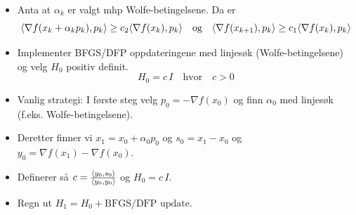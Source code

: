 \begin{itemize}
  \item Anta at \(\alpha_k\) er valgt mhp Wolfe-betingelsene. Da er
  \[
    \langle\nabla f(x_k + \alpha_k p_k), p_k\rangle \geq c_2 \langle\nabla f(x_k), p_k\rangle \quad \text{og} \quad \langle\nabla f(x_{k+1}), p_k\rangle \geq c_1 \langle\nabla f(x_k), p_k\rangle
  \]
  \item Implementer BFGS/DFP oppdateringene med linjesøk (Wolfe-betingelsene) og velg \( H_0 \) positiv definit.
  \[
    H_0 = c \, I \quad \text{hvor} \quad c > 0
  \]

  \item Vanlig strategi: I første steg velg \( p_0 = -\nabla f(x_0) \) og finn \( \alpha_0 \) med linjesøk (f.eks. Wolfe-betingelsene).
  \item Deretter finner vi \(x_1 = x_0 + \alpha_0 p_0 \) og \( s_0 = x_1 - x_0 \) og \( y_0 = \nabla f(x_1) - \nabla f(x_0) \).
  \item Definerer så \( c = \frac{\langle y_0, s_0\rangle}{\langle y_0, y_0\rangle} \) og \( H_0 = c \, I \).
  \item Regn ut \( H_1 = H_0 + \text{BFGS/DFP update} \).
\end{itemize}

